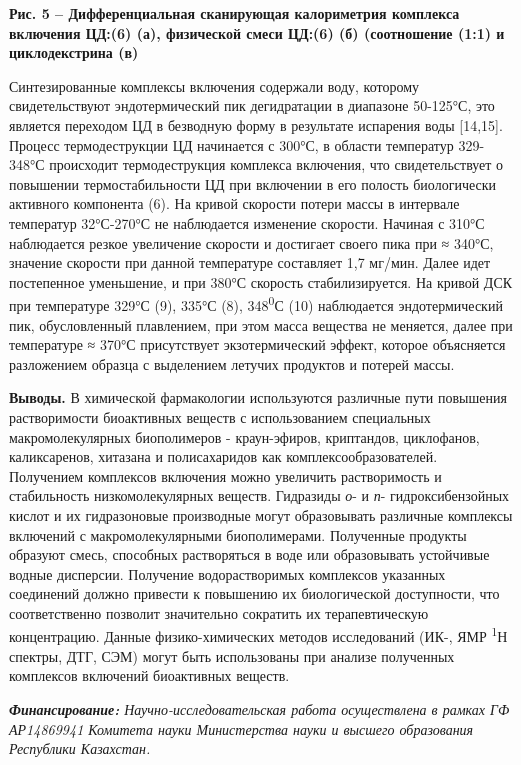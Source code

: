 {\bfseries Рис. 5 -- Дифференциальная сканирующая калориметрия комплекса
включения ЦД:(6) (а), физической смеси ЦД:(6) (б) (соотношение (1:1) и
циклодекстрина (в)}

Синтезированные комплексы включения содержали воду, которому
свидетельствуют эндотермический пик дегидратации в диапазоне 50-125°С,
это является переходом ЦД в безводную форму в результате испарения воды
{[}14,15{]}. Процесс термодеструкции ЦД начинается с 300°С, в области
температур 329-348°С происходит термодеструкция комплекса включения, что
свидетельствует о повышении термостабильности ЦД при включении в его
полость биологически активного компонента (6). На кривой скорости потери
массы в интервале температур 32°С-270°С не наблюдается изменение
скорости. Начиная с 310°С наблюдается резкое увеличение скорости и
достигает своего пика при ≈ 340°С, значение скорости при данной
температуре составляет 1,7 мг/мин. Далее идет постепенное уменьшение, и
при 380°С скорость стабилизируется. На кривой ДСК при температуре 329°С
(9), 335°С (8), 348\textsuperscript{0}С (10) наблюдается эндотермический
пик, обусловленный плавлением, при этом масса вещества не меняется,
далее при температуре ≈ 370°С присутствует экзотермический эффект,
которое объясняется разложением образца с выделением летучих продуктов и
потерей массы.

{\bfseries Выводы.} В химической фармакологии используются различные пути
повышения растворимости биоактивных веществ с использованием специальных
макромолекулярных биополимеров - краун-эфиров, криптандов, циклофанов,
каликсаренов, хитазана и полисахаридов как комплексообразователей.
Получением комплексов включения можно увеличить растворимость и
стабильность низкомолекулярных веществ. Гидразиды \emph{о}- и \emph{п}-
гидроксибензойных кислот и их гидразоновые производные могут
образовывать различные комплексы включений с макромолекулярными
биополимерами. Полученные продукты образуют смесь, способных
растворяться в воде или образовывать устойчивые водные дисперсии.
Получение водорастворимых комплексов указанных соединений должно
привести к повышению их биологической доступности, что соответственно
позволит значительно сократить их терапевтическую концентрацию. Данные
физико-химических методов исследований (ИК-, ЯМР \textsuperscript{1}Н
спектры, ДТГ, СЭМ) могут быть использованы при анализе полученных
комплексов включений биоактивных веществ.

\emph{{\bfseries Финансирование:} Научно-исследовательская работа
осуществлена в рамках ГФ АР14869941 Комитета науки Министерства науки и
высшего образования Республики Казахстан.}

